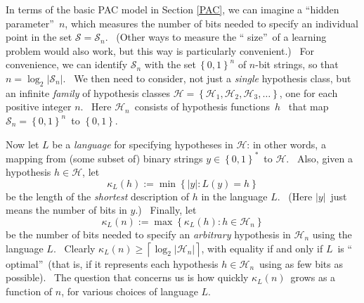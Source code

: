 \documentclass[12pt,onecolumn]{article}%
\begin{document}
In terms of the basic PAC model in Section \ref{PAC}, we can imagine a
\textquotedblleft hidden parameter\textquotedblright\ $n$, which measures the
number of bits needed to specify an individual point in the set $\mathcal{S}%
=\mathcal{S}_{n}$. \ (Other ways to measure the \textquotedblleft
size\textquotedblright\ of a learning problem would also work, but this way is
particularly convenient.) \ For convenience, we can identify $\mathcal{S}_{n}$
with the set$\ \left\{  0,1\right\}  ^{n}$ of $n$-bit strings, so that
$n=\log_{2}\left\vert \mathcal{S}_{n}\right\vert $. \ We then need to
consider, not just a \textit{single} hypothesis class, but an infinite
\textit{family} of hypothesis classes $\mathcal{H}=\left\{  \mathcal{H}%
_{1},\mathcal{H}_{2},\mathcal{H}_{3},\ldots\right\}  $, one for each positive
integer $n$. \ Here $\mathcal{H}_{n}$\ consists of hypothesis functions\ $h$%
\ that map $\mathcal{S}_{n}=\left\{  0,1\right\}  ^{n}$\ to $\left\{
0,1\right\}  $.

Now let $L$ be a \textit{language} for specifying hypotheses in $\mathcal{H}$:
in other words, a mapping from (some subset of) binary strings $y\in\left\{
0,1\right\}  ^{\ast}$\ to $\mathcal{H}$. \ Also, given a hypothesis
$h\in\mathcal{H}$, let%
\[
\kappa_{L}\left(  h\right)  :=\min\left\{  \left\vert y\right\vert :L\left(
y\right)  =h\right\}
\]
be the length of the \textit{shortest} description of $h$ in the language $L$.
\ (Here $\left\vert y\right\vert $\ just means the number of bits in $y$.)
\ Finally, let%
\[
\kappa_{L}\left(  n\right)  :=\max\left\{  \kappa_{L}\left(  h\right)
:h\in\mathcal{H}_{n}\right\}
\]
be the number of bits needed to specify an \textit{arbitrary} hypothesis in
$\mathcal{H}_{n}$ using the language $L$. \ Clearly $\kappa_{L}\left(
n\right)  \geq\left\lceil \log_{2}\left\vert \mathcal{H}_{n}\right\vert
\right\rceil $, with equality if and only if $L$\ is \textquotedblleft
optimal\textquotedblright\ (that is, if it represents each hypothesis
$h\in\mathcal{H}_{n}$\ using as few bits as possible). \ The question that
concerns us is how quickly $\kappa_{L}\left(  n\right)  $\ grows as a function
of $n$, for various choices of language $L$.
\end{document}
